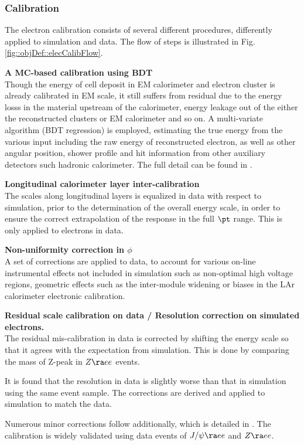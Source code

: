 \subsubsection{Calibration} \label{sec::objDef::electrons::calib}
The electron calibration consists of several different procedures, differently applied to simulation and data.
The flow of steps is illustrated in Fig. \ref{fig::objDef::elecCalibFlow}.

\begin{description}
\item \textbf{A MC-based calibration using BDT} \\
Though the energy of cell deposit in EM calorimeter and electron cluster is already calibrated in EM scale, 
it still suffers from residual due to the energy losss in the material upstream of the calorimeter, energy leakage out of the either the reconstructed clusters or EM calorimeter and so on.
A multi-variate algorithm (BDT regression) is employed, 
estimating the true energy from the various input including the raw energy of reconstructed electron, as well as other angular position, shower profile and hit information from other auxiliary detectors such hadronic calorimeter.
The full detail can be found in \cite{161_egammaCalibRun1} \cite{egammaCalib2015}. \\

\item \textbf{Longitudinal calorimeter layer inter-calibration} \\
The scales along longitudinal layers is equalized in data with respect to simulation, prior to the determination of the overall energy scale, in order to ensure the correct extrapolation of the response in the full $\pt$ range. This is only applied to electrons in data.

\item \textbf{Non-uniformity correction in $\phi$} \\
A set of corrections are applied to data, to account for various on-line instrumental effects not included in simulation such as non-optimal high voltage regions, geometric effects such as the inter-module widening or biases in the LAr calorimeter electronic calibration.

\item \textbf{Residual scale calibration on data / Resolution correction on simulated electrons.}  \\
The residual mis-calibration in data is corrected by shifting the energy scale so that it agrees with the expectation from simulation. This is done by comparing the mass of Z-peak in $Z \ra ee$ events.

It is found that the resolution in data is slightly worse than that in simulation using the same event sample.
The corrections are derived and applied to simulation to match the data. 
\end{description}
Numerous minor corrections follow additionally, which is detailed in \cite{161_egammaCalibRun1}. 
The calibration is widely validated using data events of $J/\psi \ra e e$ and $Z\ra ee$.

